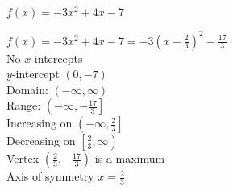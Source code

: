 {$f(x) = -3x^{2} + 4x - 7$}
{$f(x) = -3x^{2} + 4x - 7 = -3\left(x - \frac{2}{3} \right)^{2} - \frac{17}{3}$\\
No $x$-intercepts \\
$y$-intercept $(0, -7)$\\
Domain: $(-\infty, \infty)$ \\
Range: $\left(-\infty, -\frac{17}{3}\right]$ \\
Increasing on $\left(-\infty, \frac{2}{3}\right]$ \\
Decreasing on $\left[\frac{2}{3}, \infty\right)$ \\
Vertex $\left(\frac{2}{3}, -\frac{17}{3}\right)$ is a maximum \\
Axis of symmetry $x = \frac{2}{3}$

\begin{center}
\end{center}
}